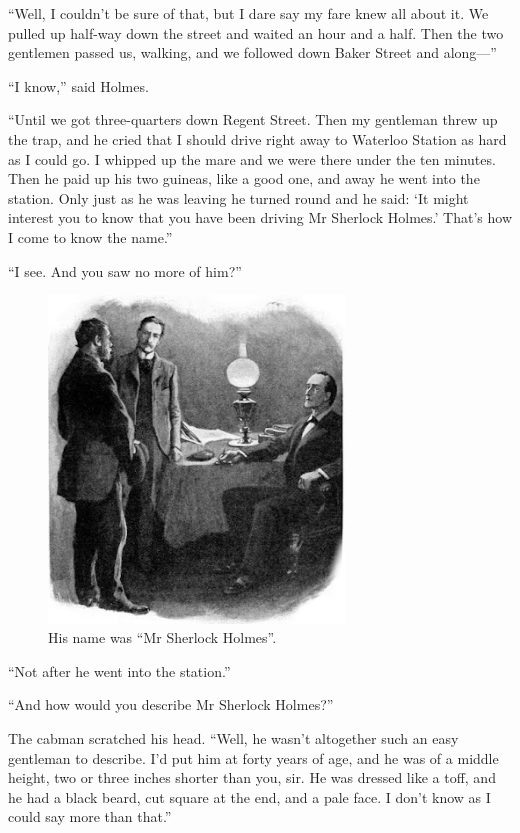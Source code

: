 \documentclass[paper=a5,BCOR=7mm,twoside,DIV=calc,12pt,usegeometry,openany,chapterprefix,endperiod,headings=big]{scrbook} %
\begin{document}
\enquote{Well, I couldn't be sure of that, but I dare say my fare knew all about it. We pulled up half-way down the street and waited an hour and a half. Then the two gentlemen passed us, walking, and we followed down Baker Street and along---}

\enquote{I know,} said Holmes.

\enquote{Until we got three-quarters down Regent Street. Then my gentleman threw up the trap, and he cried that I should drive right away to Waterloo Station as hard as I could go. I whipped up the mare and we were there under the ten minutes. Then he paid up his two guineas, like a good one, and away he went into the station. Only just as he was leaving he turned round and he said: \enquote{It might interest you to know that you have been driving Mr Sherlock Holmes.} That's how I come to know the name.}

\enquote{I see. And you saw no more of him?}

\begin{figure}[tbhp]
\centering
\includegraphics[width=0.7\textwidth]{05_cabman}
\caption{His name was \enquote{Mr Sherlock Holmes}.}
\end{figure}

\afterpage{\clearpage}


\enquote{Not after he went into the station.}

\enquote{And how would you describe Mr Sherlock Holmes?}

The cabman scratched his head. \enquote{Well, he wasn't altogether such an easy gentleman to describe. I'd put him at forty years of age, and he was of a middle height, two or three inches shorter than you, sir. He was dressed like a toff, and he had a black beard, cut square at the end, and a pale face. I don't know as I could say more than that.}
\end{document}
